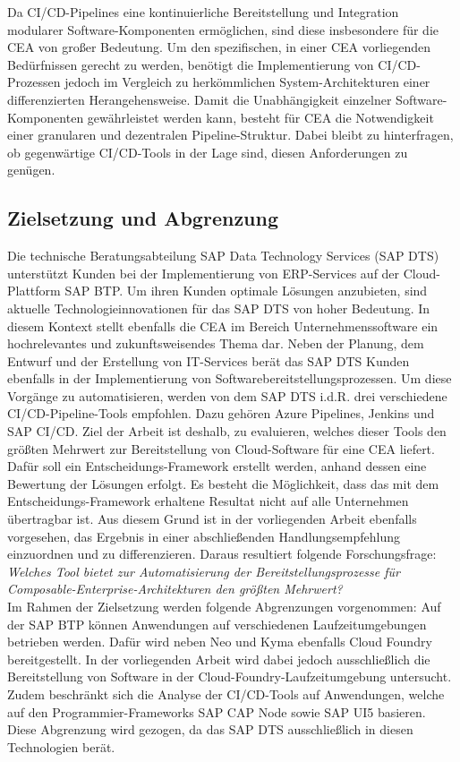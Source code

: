 Da CI/CD-Pipelines eine kontinuierliche Bereitstellung und Integration modularer Software-Komponenten ermöglichen, sind diese insbesondere für die CEA von großer Bedeutung. Um den spezifischen, in einer CEA vorliegenden Bedürfnissen gerecht zu werden, benötigt die Implementierung von CI/CD-Prozessen jedoch im Vergleich zu herkömmlichen System-Architekturen einer differenzierten Herangehensweise. Damit die Unabhängigkeit einzelner Software-Komponenten gewährleistet werden kann, besteht für CEA die Notwendigkeit einer granularen und dezentralen Pipeline-Struktur. Dabei bleibt zu hinterfragen, ob gegenwärtige CI/CD-Tools in der Lage sind, diesen Anforderungen zu genügen.


\subsection{Zielsetzung und Abgrenzung}
Die technische Beratungsabteilung SAP Data Technology Services (\acs{SAP DTS}) unterstützt Kunden bei der Implementierung von ERP-Services auf der Cloud-Plattform \ac{SAP BTP}. Um ihren Kunden optimale Lösun\-gen anzubieten, sind aktuelle Technologieinnovationen für das SAP DTS von hoher Bedeutung. In diesem Kontext stellt ebenfalls die CEA im Bereich Unternehmenssoftware ein hochrelevantes und zukunftsweisendes Thema dar. Neben der Planung, dem Entwurf und der Erstellung von IT-Services berät das SAP DTS Kunden ebenfalls in der Implementierung von Softwarebereitstellungsprozessen. Um diese Vorgänge zu automatisieren, werden von dem SAP DTS i.d.R. drei verschiedene CI/CD-Pipeline-Tools empfohlen. Dazu gehören Azure Pipelines, Jenkins und \acs{SAP CI/CD}. Ziel der Arbeit ist deshalb, zu evaluieren, welches dieser Tools den größten Mehrwert zur Bereitstellung von Cloud-Software für eine CEA liefert. Dafür soll ein Entscheidungs-Framework erstellt werden, anhand dessen eine Bewertung der Lösungen erfolgt. Es besteht die Möglichkeit, dass das mit dem Entscheidungs-Framework erhaltene Resultat nicht auf alle Unternehmen übertragbar ist. Aus diesem Grund ist in der vorliegenden Arbeit ebenfalls vorgesehen, das Ergebnis in einer abschließenden Handlungsempfehlung einzuordnen und zu differenzieren. Daraus resultiert folgende Forschungsfrage:\\
\textit{Welches Tool bietet zur Automatisierung der Bereitstellungsprozesse für Composable-\-Enterprise-Architekturen den größten Mehrwert?}\\
Im Rahmen der Zielsetzung werden folgende Abgrenzungen vorgenommen: Auf der SAP BTP können Anwendungen auf verschiedenen Laufzeitumgebungen betrieben werden. Dafür wird neben Neo und Kyma ebenfalls Cloud Foundry bereitgestellt. In der vorliegenden Arbeit wird dabei jedoch ausschließlich die Bereitstellung von Software in der Cloud-Foundry-Laufzeitumgebung untersucht. Zudem beschränkt sich die Analyse der CI/CD-Tools auf Anwendungen, welche auf den Programmier-Frameworks SAP CAP Node sowie SAP UI5 basieren. Diese Abgrenzung wird gezogen, da das SAP DTS ausschließlich in diesen Technologien berät.  

